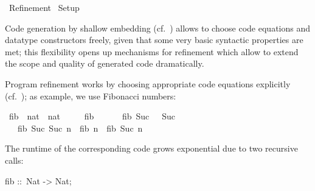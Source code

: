 %
\begin{isabellebody}%
\def\isabellecontext{Refinement}%
%
\isadelimtheory
%
\endisadelimtheory
%
\isatagtheory
{}\isamarkupfalse%
\ Refinement\isanewline
{}\ Setup\isanewline
{}%
\endisatagtheory
{\isafoldtheory}%
%
\isadelimtheory
%
\endisadelimtheory
%
\isamarkuptrue%
%
\begin{isamarkuptext}%
Code generation by shallow embedding (cf.~)
  allows to choose code equations and datatype constructors freely,
  given that some very basic syntactic properties are met; this
  flexibility opens up mechanisms for refinement which allow to extend
  the scope and quality of generated code dramatically.%
\end{isamarkuptext}%
\isamarkuptrue%
%
\isamarkuptrue%
%
\begin{isamarkuptext}%
Program refinement works by choosing appropriate code equations
  explicitly (cf.~\label{sec:equations}); as example, we use Fibonacci
  numbers:%
\end{isamarkuptext}%
\isamarkuptrue%
%
\isadelimquote
%
\endisadelimquote
%
\isatagquote
{}\isamarkupfalse%
\ fib\ {\isacharcolon}{\isacharcolon}\ {\isachardoublequoteopen}nat\ {\isasymRightarrow}\ nat{\isachardoublequoteclose}\ \isanewline
\ \ \ \ {\isachardoublequoteopen}fib\ {}\ {\isacharequal}\ {}{\isachardoublequoteclose}\isanewline
\ \ {\isacharbar}\ {\isachardoublequoteopen}fib\ {\isacharparenleft}Suc\ {}{\isacharparenright}\ {\isacharequal}\ Suc\ {}{\isachardoublequoteclose}\isanewline
\ \ {\isacharbar}\ {\isachardoublequoteopen}fib\ {\isacharparenleft}Suc\ {\isacharparenleft}Suc\ n{\isacharparenright}{\isacharparenright}\ {\isacharequal}\ fib\ n\ {\isacharplus}\ fib\ {\isacharparenleft}Suc\ n{\isacharparenright}{\isachardoublequoteclose}%
\endisatagquote
{\isafoldquote}%
%
\isadelimquote
%
\endisadelimquote
%
\begin{isamarkuptext}%
\noindent The runtime of the corresponding code grows exponential due
  to two recursive calls:%
\end{isamarkuptext}%
\isamarkuptrue%
%
\isadelimquote
%
\endisadelimquote
%
\isatagquote
%
\begin{isamarkuptext}%
\isatypewriter%
\noindent%
\hspace*{0pt}fib ::~Nat -> Nat;\\

\end{isamarkuptext}
\end{isabellebody}
